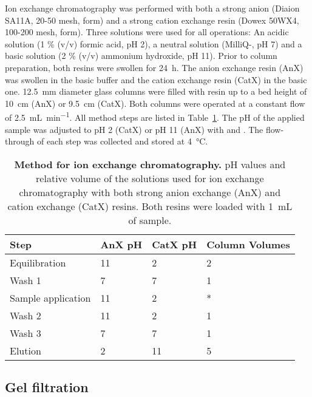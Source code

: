 Ion exchange chromatography was performed with both a strong anion (Diaion SA11A, 20-50 mesh,  form) and a strong cation exchange resin (Dowex 50WX4, 100-200 mesh,  form).
Three solutions were used for all operations: An acidic solution (1 \% (v/v) formic acid, pH 2), a neutral solution (MilliQ-, pH 7) and a basic solution (2 \% (v/v) ammonium hydroxide, pH 11).
Prior to column preparation, both resins were swollen for \SI{24}{\hour}.
The anion exchange resin (AnX) was swollen in the basic buffer and the cation exchange resin (CatX) in the basic one.
\SI{12.5}{\milli\meter} diameter glass columns were filled with resin up to a bed height of \SI{10}{\centi\meter} (AnX) or \SI{9.5}{\centi\meter} (CatX).
Both columns were operated at a constant flow of \SI{2.5}{\milli\liter\per\minute}.
All method steps are listed in Table~\ref{tab:method_ion_exchange}.
The pH of the applied sample was adjusted to pH 2 (CatX) or pH 11 (AnX) with  and .
The flow-through of each step was collected and stored at \SI{4}{\celsius}.

\begin{table}[htbp]
	\caption[Method for ion exchange chromatography]{%
			\textbf{Method for ion exchange chromatography.}
			pH values and relative volume of the solutions used for ion exchange chromatography with both strong anion exchange (AnX) and cation exchange (CatX) resins.
			Both resins were loaded with \SI{1}{\milli\liter} of sample.}
	\label{tab:method_ion_exchange}
	\centering
	\begin{tabularx}{\textwidth}{XXXX}
		\toprule
		\textbf{Step} 			& \textbf{AnX pH}	& \textbf{CatX pH} 	& \textbf{Column Volumes} 	\\
		\midrule
		Equilibration 	 		& 11 				& 2 				& 2		\\
		Wash 1 					& 7 				& 7 				& 1 	\\
		Sample application 		& 11 				& 2 				& *		\\
		Wash 2  				& 11 				& 2 				& 1 	\\
		Wash 3 					& 7					& 7 				& 1 	\\
		Elution 				& 2 				& 11 				& 5 	\\
		\bottomrule
	\end{tabularx}
\end{table}

\subsection{Gel filtration} %
\label{sub:gel_filtration}

